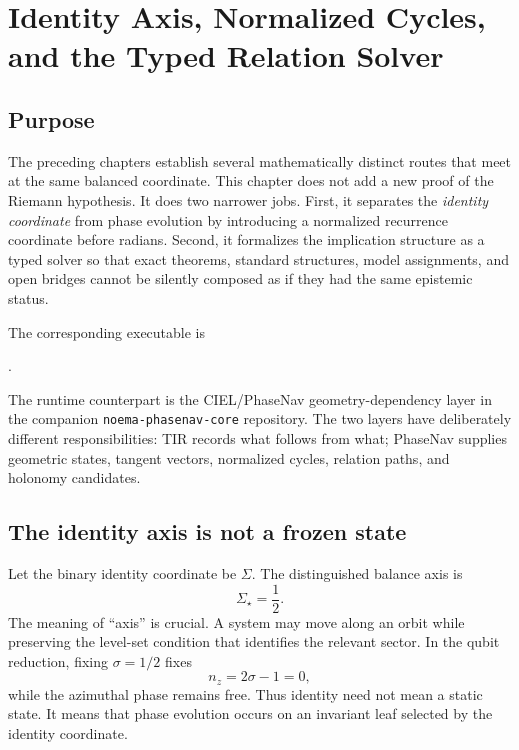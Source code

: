 \chapter{Identity Axis, Normalized Cycles, and the Typed Relation Solver}
\label{ch:identity-solver}

\section{Purpose}
The preceding chapters establish several mathematically distinct routes that meet at the same balanced coordinate.  This chapter does not add a new proof of the Riemann hypothesis.  It does two narrower jobs.  First, it separates the \emph{identity coordinate} from phase evolution by introducing a normalized recurrence coordinate before radians.  Second, it formalizes the implication structure as a typed solver so that exact theorems, standard structures, model assignments, and open bridges cannot be silently composed as if they had the same epistemic status.

The corresponding executable is
\begin{center}
.
\end{center}
The runtime counterpart is the CIEL/PhaseNav geometry-dependency layer in the companion \texttt{noema-phasenav-core} repository.  The two layers have deliberately different responsibilities: TIR records what follows from what; PhaseNav supplies geometric states, tangent vectors, normalized cycles, relation paths, and holonomy candidates.

\section{The identity axis is not a frozen state}
Let the binary identity coordinate be $\Sigma$.  The distinguished balance axis is
\begin{equation}
\Sigma_\star=\frac12.
\label{eq:sigma-axis}
\end{equation}
The meaning of ``axis'' is crucial.  A system may move along an orbit while preserving the level-set condition that identifies the relevant sector.  In the qubit reduction, fixing $\sigma=1/2$ fixes
\begin{equation}
n_z=2\sigma-1=0,
\end{equation}
while the azimuthal phase remains free.  Thus identity need not mean a static state.  It means that phase evolution occurs on an invariant leaf selected by the identity coordinate.

